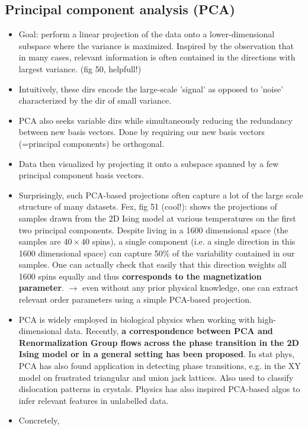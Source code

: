 \documentclass[norsk,a4paper,11pt]{article}
\begin{document}
\subsection{Principal component analysis (PCA)}
\begin{itemize}
	\item Goal: perform a linear projection of the data onto a lower-dimensional subspace where the variance is maximized. Inspired by the observation that in many cases, relevant information is often contained in the directions with largest variance. (fig 50, helpfull!)
	\item Intuitively, these dirs encode the large-scale 'signal' as opposed to 'noise' characterized by the dir of small variance. 
	\item PCA also seeks variable dirs while simultaneously reducing the redundancy between new basis vectors. Done by requiring our new basis vectors (=principal components) be orthogonal.
	\item Data then visualized by projecting it onto a subspace spanned by a few principal component basis vectors.
	\item Surprisingly, such PCA-based projections often capture a lot of the large scale structure of many datasets. Fex, fig 51 (cool!): shows the projections of samples drawn from the 2D Ising model at various temperatures on the first two principal components. Despite living in a 1600 dimensional space (the samples are $40 \times 40$ spins), a single component (i.e. a single direction in this 1600 dimensional space) can capture 50\% of the variability contained in our samples. One can actually check that easily that this direction weights all 1600 spins equally and thus \textbf{corresponds to the magnetization parameter}. $\rightarrow$ even without any prior physical knowledge, one can extract relevant order parameters using a  simple PCA-based projection.
	\item PCA is widely employed in biological physics when working with high-dimensional data. Recently, \textbf{a correspondence between PCA and Renormalization Group flows across the phase transition in the 2D Ising model or in a general setting has been proposed}. In stat phys, PCA has also found application in detecting phase transitions, e.g. in the XY model on frustrated triangular and union jack lattices. Also used to classify dislocation patterns in crystals. Physics has also inspired PCA-based algos to infer relevant features in unlabelled data.
	\item Concretely,
	\begin{itemize}

\end{itemize}
\end{itemize}
\end{document}
